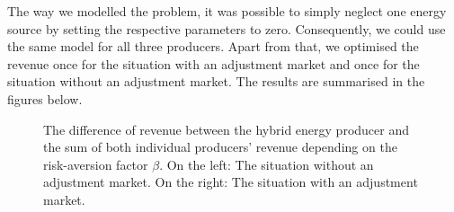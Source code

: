 The way we modelled the problem, it was possible to simply neglect one energy source by setting the respective parameters to zero. Consequently, we could use the same model for all three producers. Apart from that, we optimised the revenue once for the situation with an adjustment market and once for the situation without an adjustment market. The results are summarised in the figures below.  

\begin{figure}[h!]
	\centering
	
	\begin{minipage}{0.95\textwidth}
		\hfill
		
		\caption{The difference of revenue between the hybrid energy producer and the sum of both individual producers' revenue depending on the risk-aversion factor $\beta$. On the left: The situation without an adjustment market. On the right: The situation with an adjustment market.  }\label{fig:overyear}
	\end{minipage}	
\end{figure}

